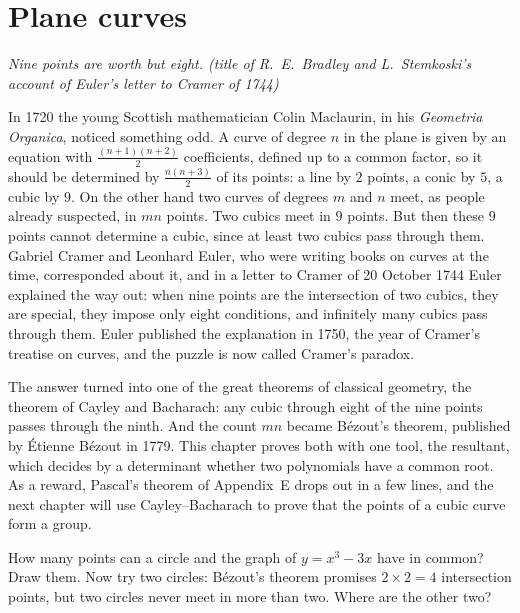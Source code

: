 \chapter{Plane curves}\label{geometry:ch:curves}

\begin{center}\itshape
Nine points are worth but eight.
\upshape(title of R.~E.~Bradley and L.~Stemkoski's account of Euler's letter to Cramer of 1744)
\end{center}

In 1720 the young Scottish mathematician Colin Maclaurin, in his \emph{Geometria Organica}, noticed something odd. A curve of degree $n$ in the plane is given by an equation with
$\frac{(n+1)(n+2)}2$ coefficients, defined up to a common factor, so it should be determined by $\frac{n(n+3)}2$ of its points: a line by $2$ points,
a conic by $5$, a cubic by $9$. On the other hand two curves of degrees $m$ and $n$ meet, as people already suspected, in $mn$ points. Two cubics meet in
$9$ points. But then these $9$ points cannot determine a cubic, since at least two cubics pass through them. Gabriel Cramer and Leonhard Euler,
who were writing books on curves at the time, corresponded about it, and in a letter to Cramer of 20 October 1744 Euler explained the way out: when nine
points are the intersection of two cubics, they are special, they impose only eight conditions, and infinitely many cubics pass through them. Euler
published the explanation in 1750, the year of Cramer's treatise on curves, and the puzzle is now called Cramer's paradox.

The answer turned into one of the great theorems of classical geometry, the theorem of Cayley and Bacharach: any cubic through eight of the nine
points passes through the ninth. And the count $mn$ became Bézout's theorem, published by \'Etienne B\'ezout in 1779. This chapter proves both with one
tool, the resultant, which decides by a determinant whether two polynomials have a common root. As a reward, Pascal's theorem of Appendix~E drops out
in a few lines, and the next chapter will use Cayley--Bacharach to prove that the points of a cubic curve form a group.

\begin{think}
How many points can a circle and the graph of $y=x^3-3x$ have in common? Draw them. Now try two circles: Bézout's theorem promises $2\times2=4$
intersection points, but two circles never meet in more than two. Where are the other two?
\end{think}

